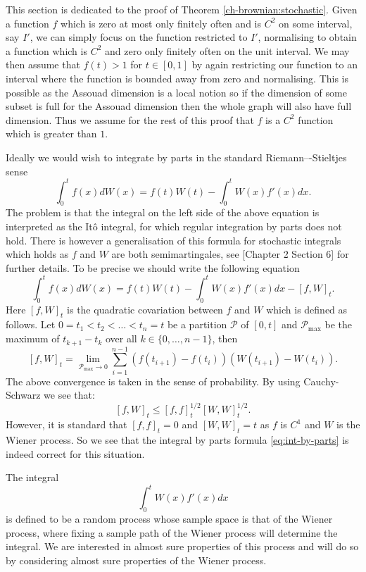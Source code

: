     This section is dedicated to the proof of Theorem \ref{ch-brownian:stochastic}.	Given a function $f$ which is zero at most only finitely often and is $C^2$ on some interval, say $I'$, we can simply focus on the function restricted to $I'$, normalising to obtain a function which is $C^2$ and zero only finitely often on the unit interval. We may then assume that $f(t)>1$ for $t\in [0,1]$ by again restricting our function to an interval where the function is bounded away from zero and normalising. This is possible as the Assouad dimension is a local notion so if the dimension of some subset is full for the Assouad dimension then the whole graph will also have full dimension. Thus we assume for the rest of this proof that $f$ is a $C^2$ function which is greater than $1$.
	
	Ideally we would wish to integrate by parts in the standard Riemann–-Stieltjes sense
	\begin{equation}
	    \int_{0}^{t}f(x)dW(x)=f(t)W(t)-\int_{0}^{t}W(x)f'(x)dx.\label{eq:int-by-parts}
	\end{equation}
	The problem is that the integral on the left side of the above equation is interpreted as the It\^{o} integral, for which regular integration by parts does not hold. There is however a generalisation of this formula for stochastic integrals which holds as $f$ and $W$ are both semimartingales, see \cite{protter}[Chapter 2 Section 6] for further details. To be precise we should write the following equation
	\[
	\int_{0}^{t}f(x)dW(x)=f(t)W(t)-\int_{0}^{t}W(x)f'(x)dx-[f,W]_t.
	\]
	Here $[f,W]_t$ is the quadratic covariation between $f$ and $W$ which is defined as follows. Let $0=t_1<t_2<\dots<t_n=t$ be a partition $\mathcal{P}$ of $[0,t]$ and $\mathcal{P}_{\max}$ be the maximum of $t_{k+1}-t_k$ over all $k\in\{0,\dots,n-1\}$, then
	\[
	[f,W]_t=\lim_{\mathcal{P}_{\max}\rightarrow 0} \sum_{i=1}^{n-1} (f(t_{i+1})-f(t_{i}))(W(t_{i+1})-W(t_i)).
	\]
	The above convergence is taken in the sense of probability. By using Cauchy-Schwarz we see that:
	\[
	[f,W]_t\leq [f,f]^{1/2}_t[W,W]^{1/2}_t.
	\]
	However, it is standard that $[f,f]_t=0$ and $[W,W]_t=t$ as $f$ is $C^1$ and $W$ is the Wiener process. So we see that the integral by parts formula \eqref{eq:int-by-parts} is indeed correct for this situation. 
	
	The integral 
	\[
	\int_0^{t} W(x)f'(x)dx
	\]
	is defined to be a random process whose sample space is that of the Wiener process, where fixing a sample path of the Wiener process will determine the integral. We are interested in almost sure properties of this process and will do so by considering almost sure properties of the Wiener process.
	
